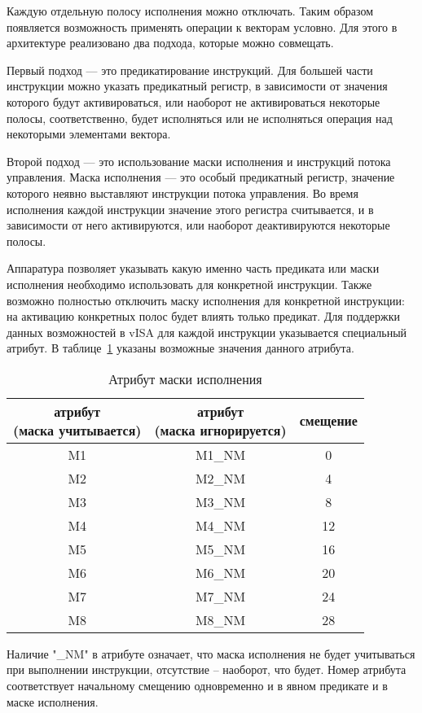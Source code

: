Каждую отдельную полосу исполнения можно отключать.
Таким образом появляется возможность применять операции к векторам условно.
Для этого в архитектуре реализовано два подхода, которые можно совмещать.

Первый подход --- это предикатирование инструкций. 
Для большей части инструкции можно указать предикатный регистр, в зависимости от значения которого будут активироваться, или наоборот не активироваться некоторые полосы, соответственно, будет исполняться или не исполняться операция над некоторыми элементами вектора.

Второй подход --- это использование маски исполнения и инструкций потока управления.
Маска исполнения --- это особый предикатный регистр, значение которого неявно выставляют инструкции потока управления.
Во время исполнения каждой инструкции значение этого регистра считывается, и в зависимости от него активируются, или наоборот деактивируются некоторые полосы.

Аппаратура позволяет указывать какую именно часть предиката или маски исполнения необходимо использовать для конкретной инструкции.
Также возможно полностью отключить маску исполнения для конкретной инструкции: на активацию конкретных полос будет влиять только предикат.
Для поддержки данных возможностей в vISA для каждой инструкции указывается специальный атрибут.
В таблице~\ref{tab:visa:mask} указаны возможные значения данного атрибута.

\begin{table}[h]
    \centering
    \begin{tabular}{c|c|c}
        \makecell{атрибут \\ (маска учитывается)} & \makecell{атрибут \\ (маска игнорируется)} & смещение  \\
        \hline
        M1 & M1\_NM & 0 \\
        M2 & M2\_NM & 4 \\
        M3 & M3\_NM & 8 \\
        M4 & M4\_NM & 12 \\
        M5 & M5\_NM & 16 \\
        M6 & M6\_NM & 20 \\
        M7 & M7\_NM & 24 \\
        M8 & M8\_NM & 28
    \end{tabular}
    \caption{Атрибут маски исполнения}
    \label{tab:visa:mask}
\end{table}

Наличие "\_NM" в атрибуте означает, что маска исполнения не будет учитываться при выполнении инструкции, отсутствие -- наоборот, что будет.
Номер атрибута соответствует начальному смещению одновременно и в явном предикате и в маске исполнения.

